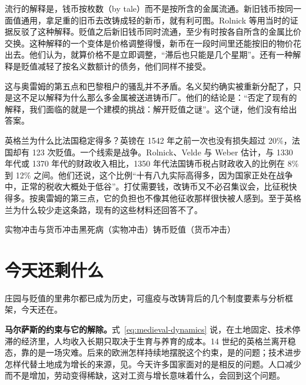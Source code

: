 流行的解释是，钱币按枚数（by tale）而不是按所含的金属流通。新旧钱币按同一面值通用，拿足重的旧币去改铸成轻的新币，就有利可图。Rolnick 等用当时的证据反驳了这种解释。贬值之后新旧钱币同时流通，至少有时按各自所含的金属比价交换。这种解释的一个变体是价格调整得慢，新币在一段时间里还能按旧的物价花出去。他们认为，就算价格不是立即调整，“滞后也只能是几个星期”。还有一种解释是贬值减轻了按名义数额计的债务，他们同样不接受\cite{rvw1996}。

这与奥雷姆的第五点和巴黎租户的骚乱并不矛盾。名义契约确实被重新分配了，只是这不足以解释为什么那么多金属被送进铸币厂。他们的结论是：“否定了现有的解释，我们面临的就是一个建模的挑战：解开贬值之谜”\cite{rvw1996}。这个谜，他们没有给出答案。

英格兰为什么比法国稳定得多？英镑在 1542 年之前一次也没有损失超过 20\%，法国却有 123 次贬值。一个线索是战争。Rolnick、Velde 与 Weber 估计，与 1330 年代或 1370 年代的财政收入相比，1350 年代法国铸币税占财政收入的比例在 8\% 到 12\% 之间。他们还说，这个比例“十有八九实际高得多，因为国家正处在战争中，正常的税收大概处于低谷”\cite{rvw1996}。打仗需要钱，改铸币又不必召集议会，比征税快得多。按奥雷姆的第三点，它的负担也不像其他征收那样很快被人感到。至于英格兰为什么较少走这条路，现有的这些材料还回答不了。

\begin{compare}{实物冲击与货币冲击}{黑死病（实物冲击）}{铸币贬值（货币冲击）}
\end{compare}

\section{今天还剩什么}\label{sec:medieval-legacy}

庄园与贬值的里弗尔都已成为历史，可瘟疫与改铸背后的几个制度要素与分析框架，今天还在。

\textbf{马尔萨斯的约束与它的解除。}式~\eqref{eq:medieval-dynamics} 说，在土地固定、技术停滞的经济里，人均收入长期只取决于生育与养育的成本。14 世纪的英格兰离开稳态，靠的是一场灾难。后来的欧洲怎样持续地摆脱这个约束，是的问题；技术进步怎样代替土地成为增长的来源，见。今天许多国家面对的是相反的问题。人口减少而不是增加，劳动变得稀缺，这对工资与增长意味着什么，会回到这个问题。


